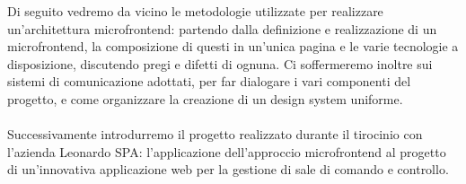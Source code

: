   Di seguito vedremo da vicino le metodologie utilizzate per realizzare un'architettura microfrontend:
partendo dalla definizione e realizzazione di un microfrontend, la composizione di questi in un'unica pagina e le varie tecnologie
  a disposizione, discutendo pregi e difetti di ognuna.
  Ci soffermeremo inoltre sui sistemi di comunicazione adottati, per far dialogare i vari componenti del progetto, e come organizzare 
  la creazione di un design system uniforme.
\\\\
  Successivamente introdurremo il progetto realizzato durante il tirocinio con l'azienda Leonardo SPA: l'applicazione dell'approccio microfrontend
  al progetto di un'innovativa applicazione web per la gestione di sale di comando e controllo.

